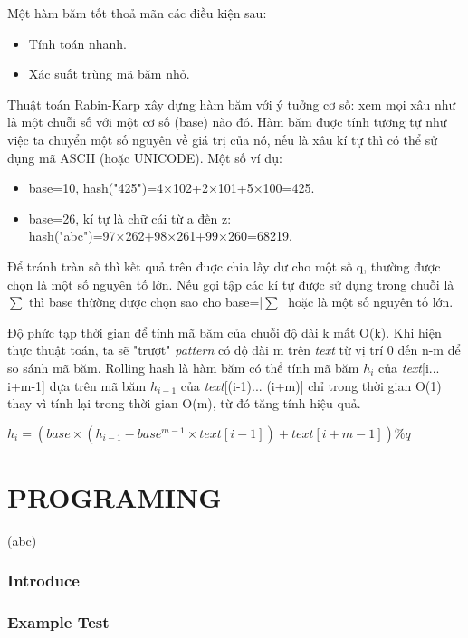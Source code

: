 \documentclass[a4paper,11pt]{article}
\begin{document}
\begin{enumerate}
			Một hàm băm tốt thoả mãn các điều kiện sau:
			\begin{itemize}
				\item Tính toán nhanh.
				\item Xác suất trùng mã băm nhỏ.
			\end{itemize}

			Thuật toán Rabin-Karp xây dựng hàm băm với ý tuởng cơ số: xem mọi xâu như là một chuỗi số với một cơ số (base) nào đó. Hàm băm đuợc tính tương tự như việc ta chuyển một số nguyên về giá trị của nó, nếu là xâu kí tự thì có thể sử dụng mã ASCII (hoặc UNICODE). Một số ví dụ:
			\begin{itemize}
			\item base=10, hash("425")=4×102+2×101+5×100=425.
			\item base=26, kí tự là chữ cái từ a đến z: hash("abc")=97×262+98×261+99×260=68219.
			\end{itemize}
			Để tránh tràn số thì kết quả trên đuợc chia lấy dư cho một số q, thường được chọn là một số nguyên tố lớn. Nếu gọi tập các kí tự được sử dụng trong chuỗi là $\sum$ thì base thừờng được chọn sao cho base=|$\sum$| hoặc là một số nguyên tố lớn.

			Độ phức tạp thời gian để tính mã băm của chuỗi độ dài k mất O(k). Khi hiện thực thuật toán, ta sẽ "trượt" \textit{pattern} có độ dài m trên \textit{text} từ vị trí 0 đến n-m để so sánh mã băm. Rolling hash là hàm băm có thể tính mã băm $h_i$ của \textit{text}[i... i+m-1] dựa trên mã băm $h_{i-1}$ của \textit{text}[(i-1)... (i+m)] chỉ trong thời gian O(1) thay vì tính lại trong thời gian O(m), từ đó tăng tính hiệu quả.

			$h_i=(base\times(h_{i-1}-base^{m-1}\times\textit{text}[i-1])+\textit{text}[i+m-1]) \% q$

	\end{enumerate}
	
	\part*{PROGRAMING}
	\label{Crossword game}(abc)
	
	
	\setcounter{section}{0}
	\section{Introduce}
	\section{Example Test}
	
\end{document}
